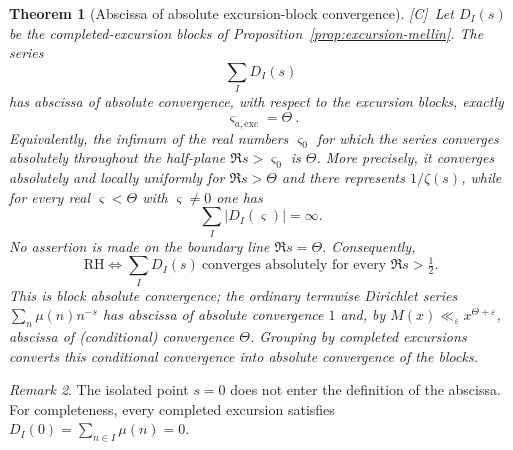 \documentclass[11pt,reqno]{amsart}
\numberwithin{equation}{section}
\theoremstyle{plain}
\newtheorem{theorem}{Theorem}[section]
\theoremstyle{definition}
\theoremstyle{remark}
\newtheorem{remark}[theorem]{Remark}
\newcommand{\eps}{\varepsilon}
\newcommand{\tagC}{\textup{[C]}}
\begin{document}
\begin{theorem}[Abscissa of absolute excursion-block convergence]
\label{thm:excursion-block-abscissa}
\tagC\ Let $D_I(s)$ be the completed-excursion blocks of
Proposition~\ref{prop:excursion-mellin}.  The series
\begin{equation}
 \sum_I D_I(s)
\end{equation}
has abscissa of absolute convergence, with respect to the excursion blocks,
exactly
\begin{equation}
 \boxed{\ \varsigma_{a,\mathrm{exc}}=\Theta\ }.
\end{equation}
Equivalently, the infimum of the real numbers $\varsigma_0$ for which the
series converges absolutely throughout the half-plane
$\Re s>\varsigma_0$ is $\Theta$.  More precisely, it converges absolutely
and locally uniformly for $\Re s>\Theta$ and there represents $1/\zeta(s)$,
while for every real $\varsigma<\Theta$ with $\varsigma\ne0$ one has
\begin{equation}
 \sum_I|D_I(\varsigma)|=\infty .
\end{equation}
No assertion is made on the boundary line $\Re s=\Theta$.
Consequently,
\begin{equation}
 \mathrm{RH}\iff
 \sum_I D_I(s)\ \text{converges absolutely for every }\Re s>\tfrac12.
\end{equation}
This is block absolute convergence; the ordinary termwise Dirichlet series
$\sum_n\mu(n)n^{-s}$ has abscissa of absolute convergence $1$ and, by
$M(x)\ll_\eps x^{\Theta+\eps}$, abscissa of (conditional) convergence
$\Theta$. Grouping by completed excursions converts this conditional
convergence into absolute convergence of the blocks.
\end{theorem}

\begin{remark}
The isolated point $s=0$ does not enter the definition of the abscissa.
For completeness, every completed excursion satisfies
$D_I(0)=\sum_{n\in I}\mu(n)=0$.
\end{remark}
\end{document}

